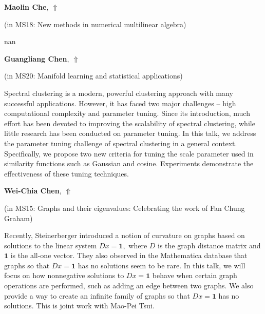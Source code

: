\documentclass[ILAS2025-program.tex]{subfiles}
\begin{document}
     \hypertarget{down0192}{}\begin{ilasabstract}
    
    \textbf{Maolin Che},  \hfill \hyperlink{up0192}{$\Uparrow$}
    
    (in {\color{mstitle}MS18: New methods in numerical multilinear algebra})
        
        \mtskip
    nan\end{ilasabstract}
     \hypertarget{down0073}{}\begin{ilasabstract}
    
    \textbf{Guangliang Chen},  \hfill \hyperlink{up0073}{$\Uparrow$}
    
    (in {\color{mstitle}MS20: Manifold learning and statistical applications})
        
        \mtskip
    Spectral clustering is a modern, powerful clustering approach with many successful applications. However, it has faced two major challenges -- high computational complexity and parameter tuning. Since its introduction, much effort has been devoted to improving the scalability of spectral clustering, while little research has been conducted on parameter tuning. In this talk, we address the parameter tuning challenge of spectral clustering in a general context. Specifically, we propose two new criteria for tuning the scale parameter used in similarity functions such as Gaussian and cosine. Experiments demonstrate the effectiveness of these tuning techniques. \end{ilasabstract}
     \hypertarget{down0139}{}\begin{ilasabstract}
    
    \textbf{Wei-Chia Chen},  \hfill \hyperlink{up0139}{$\Uparrow$}
    
    (in {\color{mstitle}MS15: Graphs and their eigenvalues: Celebrating the work of Fan Chung Graham})
        
        \mtskip
    Recently, Steinerberger introduced a notion of curvature on graphs based on solutions to the linear system $Dx=\mathbf{1},$ where $D$ is the graph distance matrix and $\mathbf{1}$ is the all-one vector. 
They also observed in the Mathematica database that graphs so that $Dx=\mathbf{1}$ has no solutions seem to be rare. 
In this talk, we will focus on how nonnegative solutions to $Dx=\mathbf{1}$ behave when certain graph operations are performed, such as adding an edge between two graphs. We also provide a way to create an infinite family of graphs so that $Dx=\mathbf{1}$ has no solutions. This is joint work with Mao-Pei Tsui.
\end{ilasabstract}
\end{document}
